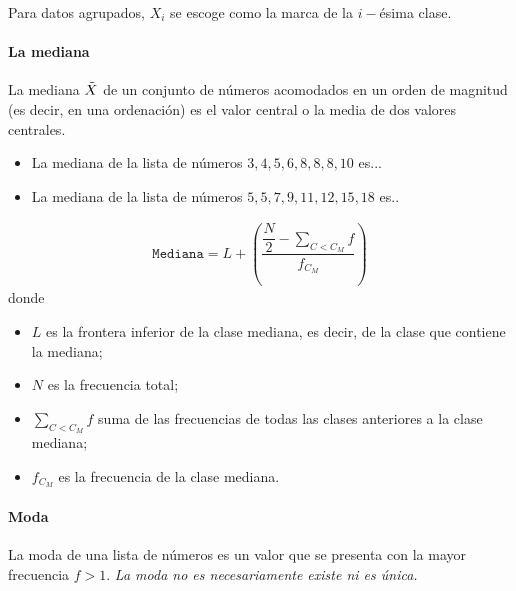  
 
 \begin{rem}

 Para datos agrupados, $X_{i}$ se escoge como la marca de la $i-$ésima clase.
 \end{rem}

 
 \paragraph{La mediana}
  La mediana $\tilde{X}$ de un conjunto de números acomodados en un orden de magnitud (es decir, en una ordenación) es el valor central o la media de dos valores centrales.
 
 
  \begin{ejemplo}
   \begin{itemize}
    \item La mediana de la lista de números $3,4,5,6,8,8,8,10$ es... 
    \item La mediana de la lista de números $5,5,7,9,11,12,15,18$ es..
   \end{itemize}

  \end{ejemplo}

 
 
  \begin{defn}
   \begin{align}
    \texttt{Mediana}=L+\left(
    \dfrac{ \dfrac{N}{2}-\sum_{{C<C_{M}}}f}{f_{C_{M}}}
    \right)
   \end{align}
   donde 
   \begin{itemize}
    \item $L$ es la frontera inferior de la clase mediana, es decir, de la clase que contiene la mediana;
    \item $N$ es la frecuencia total; 
    \item $\sum_{{C<C_{M}}}f$ suma de las frecuencias de todas las clases anteriores a la clase mediana; 
    \item $f_{C_{M}}$ es la frecuencia de la clase mediana.
   \end{itemize}

  \end{defn}

 
 \paragraph{Moda}
  La moda de una lista de números es un valor que se presenta con la mayor frecuencia $f>1$.  \emph{La moda no es necesariamente existe ni es única.}
 
